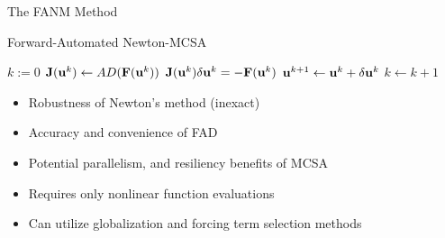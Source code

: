 \documentclass{beamer}
\begin{document}
\begin{frame}[fragile]{The FANM Method}

  Forward-Automated Newton-MCSA

  \begin{algorithm}[H]
    \begin{algorithmic}[1]
      \STATE $k := 0$ 
      \STATE $\mathbf{J}(\mathbf{u}^{k}) \leftarrow AD(\mathbf{F}(\mathbf{u}^k))$ 
      \STATE $\mathbf{J}(\mathbf{u}^k) \delta \mathbf{u}^k = -\mathbf{F}(\mathbf{u}^{k})$
      \STATE $\mathbf{u}^{k+1} \leftarrow \mathbf{u}^k + \delta \mathbf{u}^k$ 
      \STATE $k \leftarrow k+1$ 
      \ENDWHILE
    \end{algorithmic}
    \caption{FANM}
  \end{algorithm}

  \begin{itemize}
  \item Robustness of Newton's method (inexact)
  \item Accuracy and convenience of FAD
  \item Potential parallelism, and resiliency benefits of MCSA
  \item Requires only nonlinear function evaluations
  \item Can utilize globalization and forcing term selection methods
  \end{itemize}


\end{frame}
\end{document}
